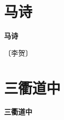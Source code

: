 \documentclass[12pt,UTF-8,openany,fontset=none]{ctexbook}
\begin{document}
\vspace{8pt}
\clearpage


\section{马诗}



\begin{center}
    {\bfseries 马诗}
\end{center}

\begin{center}
    \vspace{10pt}
    
    \begin{large}
        
        〔李贺〕
        
    \end{large}
    
    \vspace{8pt}
    
    \begin{huge}
        
        \phantom{。}

        \phantom{。}
        
        \phantom{。}

        \phantom{。}
        
    \end{huge}
    
\end{center}

\vspace{8pt}
\clearpage


\section{三衢道中}



\begin{center}
    {\bfseries 三衢道中}
\end{center}
\end{document}
